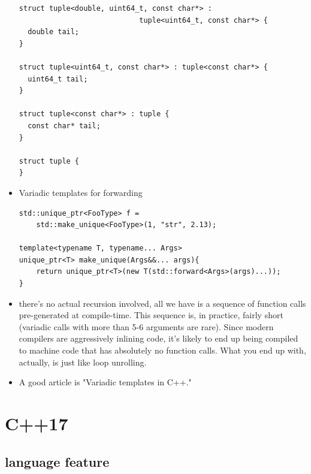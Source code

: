 \documentclass[a4paper,11pt,twoside]{book}
\begin{document}
\begin{itemize}
\begin{lstlisting}
struct tuple<double, uint64_t, const char*> : 
							tuple<uint64_t, const char*> {
  double tail;
}

struct tuple<uint64_t, const char*> : tuple<const char*> {
  uint64_t tail;
}

struct tuple<const char*> : tuple {
  const char* tail;
}

struct tuple {
}
\end{lstlisting}

\item Variadic templates for forwarding
\begin{lstlisting}
std::unique_ptr<FooType> f = 
	std::make_unique<FooType>(1, "str", 2.13);

template<typename T, typename... Args>
unique_ptr<T> make_unique(Args&&... args){
	return unique_ptr<T>(new T(std::forward<Args>(args)...));
}
\end{lstlisting}


\item there's no actual recursion involved, all we have is a sequence of function calls pre-generated at compile-time. This sequence is, in practice, fairly short (variadic calls with more than 5-6 arguments are rare). Since modern compilers are aggressively inlining code, it's likely to end up being compiled to machine code that has absolutely no function calls. What you end up with, actually, is just like loop unrolling.

\item A good article is "Variadic templates in C++."

\end{itemize}


\section{C++17}

\subsection{language feature}
\end{document}
